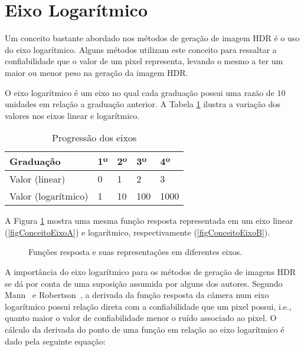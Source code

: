 \section{Eixo Logarítmico} \label{conceitoGaussiana}

	Um conceito bastante abordado nos métodos de geração de imagem HDR é o uso do eixo logarítmico. Alguns métodos utilizam este conceito para ressaltar a confiabilidade que o valor de um pixel representa, levando o mesmo a ter um maior ou menor peso na geração da imagem HDR.
	
	O eixo logarítmico é um eixo no qual cada graduação possui uma razão de $10$ unidades em relação a graduação anterior. A Tabela \ref{tabConceitosEixo} ilustra a variação dos valores nos eixos linear e logarítmico.
	
\begin{table}[H]
  \centering
  \caption{Progressão dos eixos}
  \label{tabConceitosEixo}
  \begin{tabular}{l|l|l|l|l}
    \hline
    Graduação           & 1º & 2º & 3º  & 4º   \\
    \hline
    Valor (linear)      & 0  & 1  & 2   & 3    \\
    \hline
    Valor (logarítmico) & 1  & 10 & 100 & 1000 \\  
    \hline
  \end{tabular}
\end{table}
	
	A Figura \ref{figConceitoEixo} mostra uma mesma função resposta representada em um eixo linear (\ref{figConceitoEixoA}) e logarítmico, respectivamente (\ref{figConceitoEixoB}).
	
\begin{figure}[H]
  \centering
  \quad %
  \caption{Funções resposta e suas representações em diferentes eixos.}
  \label{figConceitoEixo}
\end{figure}

	A importância do eixo logarítmico para os métodos de geração de imagens HDR se dá por conta de uma suposição assumida por alguns dos autores. Segundo Mann~\cite{mann} e Robertson~\cite{robertson}, a derivada da função resposta da câmera num eixo logarítmico possui relação direta com a confiabilidade que um pixel possui, i.e., quanto maior o valor de confiabilidade menor o ruído associado ao pixel. O cálculo da derivada do ponto de uma função em relação ao eixo logarítmico é dado pela seguinte equação:
	
